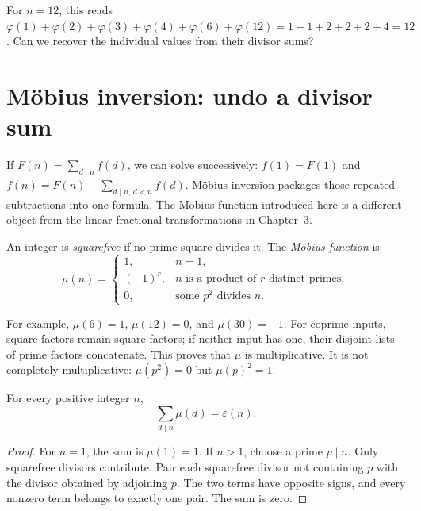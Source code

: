 For $n=12$, this reads
$\varphi(1)+\varphi(2)+\varphi(3)+\varphi(4)+\varphi(6)+\varphi(12)
=1+1+2+2+2+4=12$.
Can we recover the individual values from their divisor sums?

\section{M\"obius inversion: undo a divisor sum}
\label{sec:mobius-inversion}

If $F(n)=\sum_{d\mid n}f(d)$, we can solve successively:
$f(1)=F(1)$ and $f(n)=F(n)-\sum_{d\mid n,\,d<n}f(d)$.
M\"obius inversion packages those repeated subtractions into one formula.
The M\"obius function introduced here is a different object from the
linear fractional transformations in Chapter~3.

\begin{definition}
An integer is \emph{squarefree} if no prime square divides it.
The \emph{M\"obius function} is
\[
 \mu(n)=
 \begin{cases}
 1,&n=1,\\
 (-1)^r,&n\text{ is a product of }r\text{ distinct primes},\\
 0,&\text{some }p^2\text{ divides }n.
 \end{cases}
\]
\end{definition}

For example, $\mu(6)=1$, $\mu(12)=0$, and $\mu(30)=-1$.
For coprime inputs, square factors remain square factors; if neither
input has one, their disjoint lists of prime factors concatenate.
This proves that $\mu$ is multiplicative. It is not completely
multiplicative: $\mu(p^2)=0$ but $\mu(p)^2=1$.

\begin{lemma}
For every positive integer $n$,
\[
 \sum_{d\mid n}\mu(d)=\varepsilon(n).
\]
\end{lemma}
\begin{proof}
For $n=1$, the sum is $\mu(1)=1$. If $n>1$, choose a prime $p\mid n$.
Only squarefree divisors contribute. Pair each squarefree divisor
not containing $p$ with the divisor obtained by adjoining $p$.
The two terms have opposite signs, and every nonzero term belongs
to exactly one pair. The sum is zero.
\end{proof}

